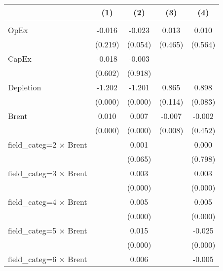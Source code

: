 \begin{tabular}{l*{4}{c}} \hline\hline
                                        &\multicolumn{1}{c}{(1)}&\multicolumn{1}{c}{(2)}&\multicolumn{1}{c}{(3)}&\multicolumn{1}{c}{(4)}\\
\hline
                                    &            &            &            &            \\
OpEx                                    &      -0.016&      -0.023&       0.013&       0.010\\
                                        &     (0.219)&     (0.054)&     (0.465)&     (0.564)\\
CapEx                                   &      -0.018&      -0.003&            &            \\
                                        &     (0.602)&     (0.918)&            &            \\
Depletion                               &      -1.202&      -1.201&       0.865&       0.898\\
                                        &     (0.000)&     (0.000)&     (0.114)&     (0.083)\\
Brent                                   &       0.010&       0.007&      -0.007&      -0.002\\
                                        &     (0.000)&     (0.000)&     (0.008)&     (0.452)\\
field_categ=2 $\times$ Brent            &            &       0.001&            &       0.000\\
                                        &            &     (0.065)&            &     (0.798)\\
field_categ=3 $\times$ Brent            &            &       0.003&            &       0.003\\
                                        &            &     (0.000)&            &     (0.000)\\
field_categ=4 $\times$ Brent            &            &       0.005&            &       0.005\\
                                        &            &     (0.000)&            &     (0.000)\\
field_categ=5 $\times$ Brent            &            &       0.015&            &      -0.025\\
                                        &            &     (0.000)&            &     (0.000)\\
field_categ=6 $\times$ Brent            &            &       0.006&            &      -0.005\\

\end{tabular}

